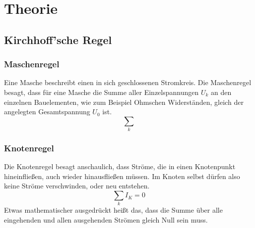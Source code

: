 \section{Theorie}
\label{sec:Theorie}

\subsection{Kirchhoff'sche Regel}

\subsubsection{Maschenregel}
Eine Masche beschreibt einen in sich geschlossenen Stromkreis. Die Maschenregel besagt, dass für eine Masche die Summe
aller Einzelspannungen $U_k$ an den einzelnen Bauelementen, wie zum Beispiel Ohmschen Widerständen,
gleich der angelegten Gesamtspannung $U_0$ ist.
\begin{equation}
\sum_{k}
\end{equation}

\subsubsection{Knotenregel}
Die Knotenregel besagt anschaulich, dass Ströme, die in einen Knotenpunkt
hineinfließen, auch wieder hinausfließen müssen. Im Knoten selbst dürfen also keine Ströme verschwinden,
oder neu entstehen.
\begin{equation}
\sum_{k}{I_K}=0
\end{equation}
Etwas mathematischer ausgedrückt heißt das, dass die Summe über alle eingehenden
und allen ausgehenden Strömen gleich Null sein muss.



